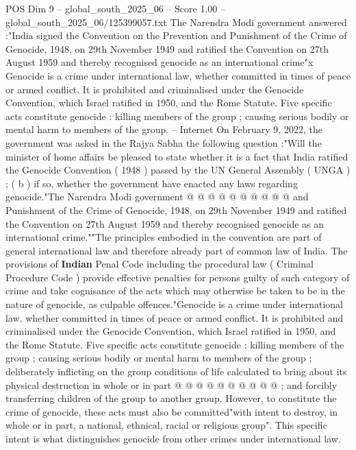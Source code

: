 \begin{textsample}{POS Dim 9 – global\_south\_2025\_06 – Score 1.00 – global\_south\_2025\_06/125399057.txt}  \label{ex:f9_pos_192}
The Narendra Modi government answered :"India signed the Convention on the Prevention and Punishment of the Crime of Genocide, 1948, on 29th November 1949 and ratified the Convention on 27th August 1959 and thereby recognised genocide as an international crime"x Genocide is a crime under international law, whether committed in times of peace or armed conflict.
It is prohibited and criminalised under the Genocide Convention, which Israel ratified in 1950, and the Rome Statute.
Five specific acts constitute genocide : killing members of the group ; causing serious bodily or mental harm to members of the group. -- Internet On February 9, 2022, the government was asked in the Rajya Sabha the following question :"Will the minister of home affairs be pleased to state whether it is a fact that India ratified the Genocide Convention ( 1948 ) passed by the UN General Assembly ( UNGA ) ; ( b ) if so, whether the government have enacted any laws regarding genocide."The Narendra Modi government @ @ @ @ @ @ @ @ @ @ and Punishment of the Crime of Genocide, 1948, on 29th November 1949 and ratified the Convention on 27th August 1959 and thereby recognised genocide as an international crime.""The principles embodied in the convention are part of general international law and therefore already part of common law of India.
The provisions of \textbf{Indian} Penal Code including the procedural law ( Criminal Procedure Code ) provide effective penalties for persons guilty of such category of crime and take cognisance of the acts which may otherwise be taken to be in the nature of genocide, as culpable offences."Genocide is a crime under international law, whether committed in times of peace or armed conflict.
It is prohibited and criminalised under the Genocide Convention, which Israel ratified in 1950, and the Rome Statute.
Five specific acts constitute genocide : killing members of the group ; causing serious bodily or mental harm to members of the group ; deliberately inflicting on the group conditions of life calculated to bring about its physical destruction in whole or in part @ @ @ @ @ @ @ @ @ @ ; and forcibly transferring children of the group to another group.
However, to constitute the crime of genocide, these acts must also be committed"with intent to destroy, in whole or in part, a national, ethnical, racial or religious group".
This specific intent is what distinguishes genocide from other crimes under international law.

\end{textsample}
